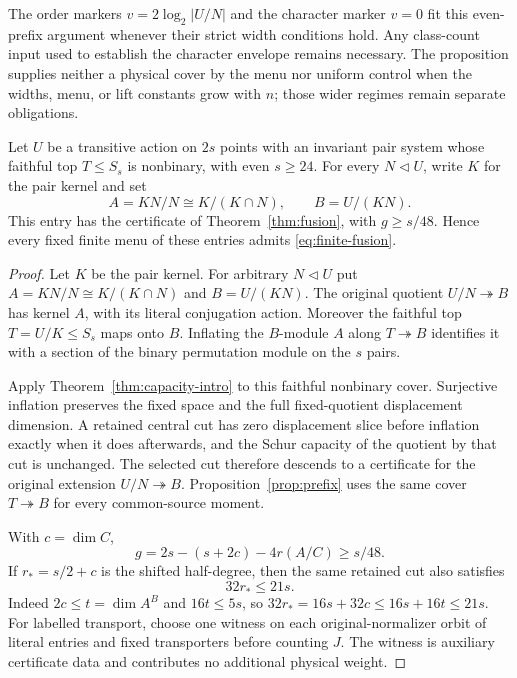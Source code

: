 The order markers $v=2\log_2|U/N|$ and the character marker $v=0$
fit this even-prefix argument whenever their strict width conditions
hold. Any class-count input used to establish the character envelope
remains necessary. The proposition supplies neither a physical cover
by the menu nor uniform control when the widths, menu, or lift constants
grow with $n$; those wider regimes remain separate obligations.

\begin{corollary}\label{cor:pair-fusion}
Let $U$ be a transitive action on $2s$ points with an invariant pair
system whose faithful top $T\leq S_s$ is nonbinary, with even $s\geq24$.
For every $N\lhd U$, write $K$ for the pair kernel and set
\[
 A=KN/N\cong K/(K\cap N),\qquad B=U/(KN).
\]
This entry has the certificate of Theorem~\ref{thm:fusion}, with
$g\geq s/48$. Hence every fixed finite menu of these entries admits
\eqref{eq:finite-fusion}.
\end{corollary}
\begin{proof}
Let $K$ be the pair kernel. For arbitrary $N\lhd U$ put
$A=KN/N\cong K/(K\cap N)$ and $B=U/(KN)$. The original quotient
$U/N\twoheadrightarrow B$ has kernel $A$, with its literal conjugation
action. Moreover the faithful top $T=U/K\leq S_s$ maps onto $B$.
Inflating the $B$-module $A$ along $T\twoheadrightarrow B$ identifies it
with a section of the binary permutation module on the $s$ pairs.

Apply Theorem~\ref{thm:capacity-intro} to this faithful nonbinary cover.
Surjective inflation preserves the fixed space and the full
fixed-quotient displacement dimension. A retained central cut has zero
displacement slice before inflation exactly when it does afterwards, and
the Schur capacity of the quotient by that cut is unchanged. The selected
cut therefore descends to a certificate for the original extension
$U/N\twoheadrightarrow B$. Proposition~\ref{prop:prefix} uses the same
cover $T\twoheadrightarrow B$ for every common-source moment.

With $c=\dim C$,
\[
 g=2s-(s+2c)-4r(A/C)\geq s/48.
\]
If $r_*=s/2+c$ is the shifted half-degree, then the same retained cut
also satisfies
\begin{equation}\label{eq:nonbinary-prefix-strength}
 32r_*\leq21s.
\end{equation}
Indeed $2c\leq t=\dim A^B$ and $16t\leq5s$, so
$32r_*=16s+32c\leq16s+16t\leq21s$.
For labelled transport, choose one witness on each original-normalizer
orbit of literal entries and fixed transporters before counting $J$.
The witness is auxiliary certificate data and contributes no additional
physical weight.
\end{proof}

